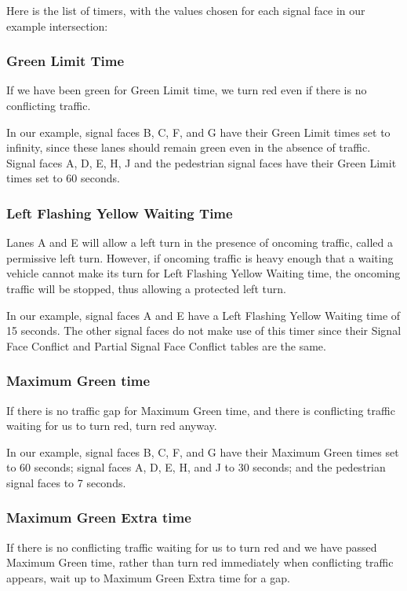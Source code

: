 \documentclass[letterpaper,twoside]{article}
\begin{document}
Here is the list of timers, with the values chosen for each signal face in
our example intersection:

\subsubsection{Green Limit Time}
If we have been green for Green Limit time, we turn red even if there is
no conflicting traffic.

In our example, signal faces B, C, F, and G have their Green Limit times
set to infinity, since these lanes should remain green even in the absence
of traffic.  Signal faces A, D, E, H, J and the pedestrian signal faces
have their Green Limit times set to 60 seconds.

\subsubsection{Left Flashing Yellow Waiting Time}
Lanes A and E will allow a left turn in the presence of oncoming traffic,
called a permissive left turn.
However, if oncoming traffic is heavy enough that a waiting vehicle
cannot make its turn for Left Flashing Yellow Waiting time, the oncoming
traffic will be stopped, thus allowing a protected left turn.

In our example, signal faces A and E have a Left Flashing Yellow Waiting time
of 15 seconds.  The other signal faces do not make use of this timer
since their Signal Face Conflict and Partial Signal Face
Conflict tables are the same.

\subsubsection{Maximum Green time}
If there is no traffic gap for Maximum Green time, and there is conflicting
traffic waiting for us to turn red, turn red anyway.

In our example, signal faces B, C, F, and G have their Maximum Green
times set to 60 seconds; signal faces A, D, E, H, and J to 30 seconds;
and the pedestrian signal faces to 7 seconds.

\subsubsection{Maximum Green Extra time}
If there is no conflicting traffic waiting for us to turn red and we have
passed Maximum Green time, rather than turn red immediately when conflicting
traffic appears, wait up to Maximum Green Extra time for a gap.
\end{document}
